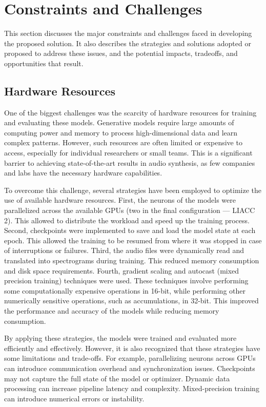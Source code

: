 \section{Constraints and Challenges} \label{sec:res-limitations}

This section discusses the major constraints and challenges faced in developing the proposed solution. It also describes the strategies and solutions adopted or proposed to address these issues, and the potential impacts, tradeoffs, and opportunities that result.

\subsection{Hardware Resources}

One of the biggest challenges was the scarcity of hardware resources for training and evaluating these models. Generative models require large amounts of computing power and memory to process high-dimensional data and learn complex patterns. However, such resources are often limited or expensive to access, especially for individual researchers or small teams. This is a significant barrier to achieving state-of-the-art results in audio synthesis, as few companies and labs have the necessary hardware capabilities.

To overcome this challenge, several strategies have been employed to optimize the use of available hardware resources. First, the neurons of the models were parallelized across the available \acp{GPU} (two in the final configuration --- \ac{LIACC} 2). This allowed to distribute the workload and speed up the training process. Second, checkpoints were implemented to save and load the model state at each epoch. This allowed the training to be resumed from where it was stopped in case of interruptions or failures. Third, the audio files were dynamically read and translated into spectrograms during training. This reduced memory consumption and disk space requirements. Fourth, gradient scaling and autocast (mixed precision training) techniques were used. These techniques involve performing some computationally expensive operations in 16-bit, while performing other numerically sensitive operations, such as accumulations, in 32-bit. This improved the performance and accuracy of the models while reducing memory consumption.

By applying these strategies, the models were trained and evaluated more efficiently and effectively. However, it is also recognized that these strategies have some limitations and trade-offs. For example, parallelizing neurons across \acp{GPU} can introduce communication overhead and synchronization issues. Checkpoints may not capture the full state of the model or optimizer. Dynamic data processing can increase pipeline latency and complexity. Mixed-precision training can introduce numerical errors or instability.

